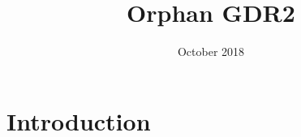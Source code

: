 \documentclass{article}
\title{Orphan GDR2}
\author{ }
\date{October 2018}
\begin{document}
\maketitle

\section{Introduction}
\end{document}

